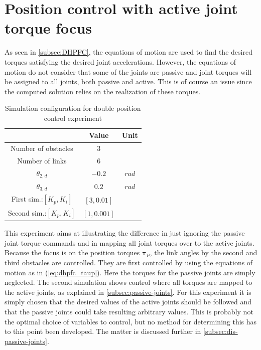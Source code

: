 \section{Position control with active joint torque focus}\label{sec:pas-pos}

As seen in \ref{subsec:DHPFC}, the equations of motion are used to find the desired torques satisfying the desired joint accelerations. However, the equations of motion do not consider that some of the joints are passive and joint torques will be assigned to all joints, both passive and active. This is of course an issue since the computed solution relies on the realization of these torques.

\begin{table}[H]
    \centering
    \begin{tabular}{|c|c|c|}
        \hline
        & \textbf{Value} & \textbf{Unit}\\
        \hline \hline
        Number of obstacles & $3$ & \\
        Number of links & $6$ & \\
        $\theta_{2,d}$ & $-0.2$ & $rad$ \\
        $\theta_{3,d}$ & $0.2$ & $rad$ \\
        First sim.:$[K_{p}, K_{i}]$ & $[3, 0.01]$ &\\
        Second sim.:$[K_{p}, K_{i}]$ & $[1, 0.001]$ &\\
        \hline
    \end{tabular}
    \caption{Simulation configuration for double position control experiment}
    \label{tab:exp_2xp}
\end{table}

This experiment aims at illustrating the difference in just ignoring the passive joint torque commands and in mapping all joint torques over to the active joints. Because the focus is on the position torques $\boldsymbol{\tau}_P$, the link angles by the second and third obstacles are controlled. They are first controlled by using the equations of motion as in (\ref{eq:dhpfc_taup}). Here the torques for the passive joints are simply neglected. The second simulation shows control where all torques are mapped to the active joints, as explained in \ref{subsec:passive-joints}. For this experiment it is simply chosen that the desired values of the active joints should be followed and that the passive joints could take resulting arbitrary values. This is probably not the optimal choice of variables to control, but no method for determining this has to this point been developed. The matter is discussed further in \ref{subsec:dis-passive-joints}.

